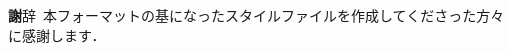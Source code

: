 \documentclass[T,J]{fose} %
\begin{document}
{\textbf 謝辞}\
本フォーマットの基になったスタイルファイルを作成してくださった方々に感謝します．





\end{document}

